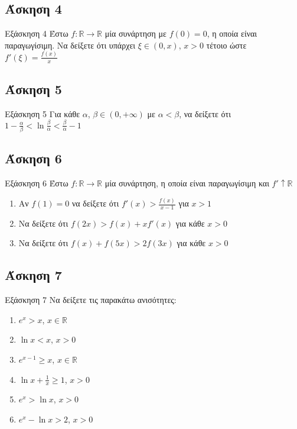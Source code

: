 \documentclass[greek]{beamer}
\begin{document}
\subsection{Άσκηση 4}
\begin{frame}[label=Άσκηση4]{Εξάσκηση 4}
  Έστω $f:\mathbb{R}\to\mathbb{R}$ μία συνάρτηση με $f(0)=0$, η οποία είναι παραγωγίσιμη. Να δείξετε ότι υπάρχει $ξ\in (0,x)$, $x>0$ τέτοιο ώστε $f'(ξ)=\frac{f(x)}{x}$

\end{frame}

\subsection{Άσκηση 5}
\begin{frame}[label=Άσκηση5]{Εξάσκηση 5}
  Για κάθε $α$, $β\in (0,+\infty)$ με $α<β$, να δείξετε ότι $1-\frac{α}{β}<\ln \frac{β}{α}<\frac{β}{α}-1$

\end{frame}

\subsection{Άσκηση 6}
\begin{frame}[label=Άσκηση6]{Εξάσκηση 6}
  Έστω $f:\mathbb{R}\to\mathbb{R}$ μία συνάρτηση, η οποία είναι παραγωγίσιμη και $f'\uparrow \mathbb{R}$
  \begin{enumerate}
    \item<1-> Αν $f(1)=0$ να δείξετε ότι $f'(x)>\frac{f(x)}{x-1}$ για $x>1$
    \item<2-> Να δείξετε ότι $f(2x)>f(x)+xf'(x)$ για κάθε $x>0$
    \item<3-> Να δείξετε ότι $f(x)+f(5x)>2f(3x)$ για κάθε $x>0$
  \end{enumerate}

\end{frame}

\subsection{Άσκηση 7}
\begin{frame}[label=Άσκηση7]{Εξάσκηση 7}
  Να δείξετε τις παρακάτω ανισότητες:
  \begin{enumerate}
    \item<1-> $e^x> x$, $x\in\mathbb{R}$
    \item<2-> $\ln x<x$, $x>0$
    \item<3-> $e^{x-1}\ge x$, $x\in\mathbb{R}$
    \item<4-> $\ln x+\frac{1}{x}\ge 1$, $x>0$
    \item<5-> $e^x>\ln x$, $x>0$
    \item<6-> $e^x-\ln x>2$, $x>0$
  \end{enumerate}

\end{frame}
\end{document}
